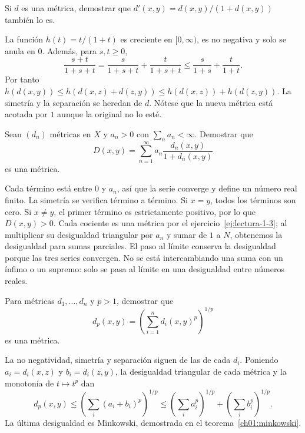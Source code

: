\begin{ejercicio}\label{ej:lectura-1-3}
Si $d$ es una métrica, demostrar que $d'(x,y)=d(x,y)/(1+d(x,y))$ también lo es.
\end{ejercicio}
\begin{solucion}
La función $h(t)=t/(1+t)$ es creciente en $[0,\infty)$, es no negativa y solo se anula en $0$. Además, para $s,t\ge0$,
\[
\frac{s+t}{1+s+t}=\frac{s}{1+s+t}+\frac{t}{1+s+t}
\le\frac{s}{1+s}+\frac{t}{1+t}.
\]
Por tanto $h(d(x,y))\le h(d(x,z)+d(z,y))\le h(d(x,z))+h(d(z,y))$. La simetría y la separación se heredan de $d$. Nótese que la nueva métrica está acotada por $1$ aunque la original no lo esté.
\end{solucion}

\begin{ejercicio}\label{ej:lectura-1-4}
Sean $(d_n)$ métricas en $X$ y $a_n>0$ con $\sum_na_n<\infty$. Demostrar que
\[
D(x,y)=\sum_{n=1}^{\infty}a_n\frac{d_n(x,y)}{1+d_n(x,y)}
\]
es una métrica.
\end{ejercicio}
\begin{solucion}
Cada término está entre $0$ y $a_n$, así que la serie converge y define un número real finito. La simetría se verifica término a término. Si $x=y$, todos los términos son cero. Si $x\ne y$, el primer término es estrictamente positivo, por lo que $D(x,y)>0$. Cada cociente es una métrica por el ejercicio~\ref{ej:lectura-1-3}; al multiplicar su desigualdad triangular por $a_n$ y sumar de $1$ a $N$, obtenemos la desigualdad para sumas parciales. El paso al límite conserva la desigualdad porque las tres series convergen. No se está intercambiando una suma con un ínfimo o un supremo: solo se pasa al límite en una desigualdad entre números reales.
\end{solucion}

\begin{ejercicio}\label{ej:lectura-1-5}
Para métricas $d_1,\ldots,d_n$ y $p>1$, demostrar que
\[
d_p(x,y)=\left(\sum_{i=1}^n d_i(x,y)^p\right)^{1/p}
\]
es una métrica.
\end{ejercicio}
\begin{solucion}
La no negatividad, simetría y separación siguen de las de cada $d_i$. Poniendo $a_i=d_i(x,z)$ y $b_i=d_i(z,y)$, la desigualdad triangular de cada métrica y la monotonía de $t\mapsto t^p$ dan
\[
d_p(x,y)\le\left(\sum_i(a_i+b_i)^p\right)^{1/p}
\le\left(\sum_i a_i^p\right)^{1/p}+\left(\sum_i b_i^p\right)^{1/p}.
\]
La última desigualdad es Minkowski, demostrada en el teorema~\ref{ch01:minkowski}.
\end{solucion}


